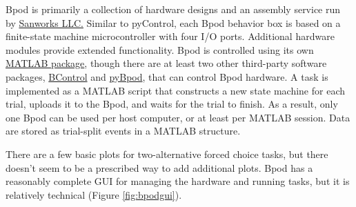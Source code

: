 Bpod is primarily a collection of hardware designs and an assembly service run by \href{https://www.sanworks.io/about/about.php}{Sanworks LLC.} Similar to pyControl, each Bpod behavior box is based on a finite-state machine microcontroller with four I/O ports. Additional hardware modules provide extended functionality. Bpod is controlled using its own \href{https://github.com/sanworks/Bpod_Gen2}{MATLAB package}, though there are at least two other third-party software packages, \href{https://brodylabwiki.princeton.edu/bcontrol/index.php/Main_Page}{BControl} and \href{https://pybpod.github.io/}{pyBpod}, that can control Bpod hardware. A task is implemented as a MATLAB script that constructs a new state machine for each trial, uploads it to the Bpod, and waits for the trial to finish. As a result, only one Bpod can be used per host computer, or at least per MATLAB session. Data are stored as trial-split events in a MATLAB structure.

There are a few basic plots for two-alternative forced choice tasks, but there doesn't seem to be a prescribed way to add additional plots. Bpod has a reasonably complete GUI for managing the hardware and running tasks, but it is relatively technical (Figure \ref{fig:bpodgui}).

